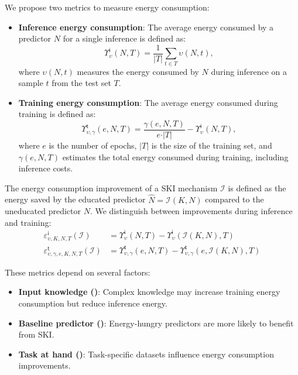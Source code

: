 %
We propose two metrics to measure energy consumption:
%
\begin{itemize}
    \item \textbf{Inference energy consumption}:
    The average energy consumed by a predictor \(N\) for a single inference is defined as:
    \begin{equation}
        \label{eq:inference-energy}
        \Upsilon^\mathsf{i}_{\upsilon}(N, T) = \frac{1}{\vert T \vert} \sum_{t \in T} \upsilon(N, t),
    \end{equation}
    where \(\upsilon(N, t)\) measures the energy consumed by \(N\) during inference on a sample \(t\) from the test set \(T\).
    \item \textbf{Training energy consumption}:
    The average energy consumed during training is defined as:
    \begin{equation}
        \label{eq:training-energy}
        \Upsilon^\mathsf{t}_{\upsilon, \gamma}(e, N, T) = \frac{\gamma(e, N, T)}{e \cdot \vert T \vert} -  \Upsilon^\mathsf{i}_\upsilon(N, T),
    \end{equation}
    where \(e\) is the number of epochs, \(|T|\) is the size of the training set, and \(\gamma(e, N, T)\) estimates the total energy consumed during training, including inference costs.
\end{itemize}

%
The energy consumption improvement of a \gls{SKI} mechanism \(\mathcal{I}\) is defined as the energy saved by the educated predictor \(\hat{N} = \mathcal{I}(K, N)\) compared to the uneducated predictor \(N\).
%
We distinguish between improvements during inference and training:
%
\begin{align}
    \varepsilon^\mathsf{i}_{\upsilon, K, N, T}(\mathcal{I}) &= \Upsilon^\mathsf{i}_{\upsilon}(N, T) - \Upsilon^\mathsf{i}_{\upsilon}(\mathcal{I}(K, N), T)
    \\
    \varepsilon^\mathsf{t}_{\upsilon, \gamma, e, K, N, T}(\mathcal{I}) &= \Upsilon^\mathsf{t}_{\upsilon, \gamma}(e, N, T) - \Upsilon^\mathsf{t}_{\upsilon, \gamma}(e, \mathcal{I}(K, N), T)
\end{align}

%
These metrics depend on several factors:
%
\begin{itemize}
    \item \textbf{Input knowledge ()}: Complex knowledge may increase training energy consumption but reduce inference energy.
    \item \textbf{Baseline predictor ()}: Energy-hungry predictors are more likely to benefit from \gls{SKI}.
    \item \textbf{Task at hand ()}: Task-specific datasets influence energy consumption improvements.
\end{itemize}

